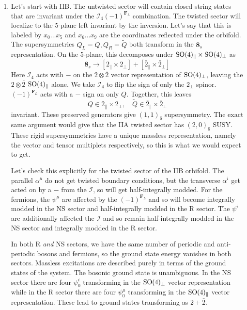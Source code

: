 \documentclass[11pt, class=article, crop=false]{standalone}
\begin{document}
\begin{enumerate}
	\item Let's start with IIB. The untwisted sector will contain closed string states that are invariant under the $\mathcal I_4 (-1)^{\mathbf{F}_L}$ combination. The twisted sector will localize to the 5-plane left invariant by the inversion. Let's say that this is labeled by $x_0 \dots x_5$ and $x_6 \dots x_9$ are the coordinates reflected under the orbifold. The supersymmetries $Q_L = Q, Q_R = \tilde Q$ both transform in the $\mathbf{8}_s$ representation. On the 5-plane, this decomposes under $\mathrm{SO}(4)_\parallel \times \mathrm{SO}(4)_\perp$ as
	\[
		\mathbf{8}_s \to [2_\parallel \times 2_\perp] + [\bar 2_{\parallel} \times \bar 2_{\perp}]
	\]
	Here $\mathcal I_4$ acts with $-$ on the $2 \otimes \bar 2$ vector representation of $\mathrm{SO}(4)_\perp$, leaving the $2 \otimes \bar 2$ $\mathrm{SO}(4)_\parallel$ alone. We take $\mathcal I_4$ to flip the sign of only the $2_\perp$ spinor. $(-1)^{\mathbf{F}_L}$  acts with a $-$ sign on only $Q$. Together, this leaves
	\[
		Q \in 2_\parallel \times 2_\perp, \quad \tilde Q \in \bar 2_\parallel \times \bar 2_\perp
	\]
	invariant. These preserved generators give $(1,1)_6$ supersymmetry. The exact same argument would give that the IIA twisted sector has $(2,0)_6$ SUSY. These rigid supersymmetries have a unique massless representation, namely the vector and tensor multiplets respectively, so this is what we would expect to get.
	
	 Let's check this explicitly for the twisted sector of the IIB orbifold. The parallel $\alpha^\mu$ do not get twisted boundary conditions, but the transverse $\alpha^i$ get acted on by a $-$ from the $\mathcal I$, so will get half-integrally modded. For the fermions, the $\psi^\mu$ are affected by the $(-1)^{\mathbf{F}_L}$ and so will become integrally modded in the NS sector and half-integrally modded in the R sector. The $\psi^i$ are additionally affected the $\mathcal I$ and so remain half-integrally modded in the NS sector and integrally modded in the R sector. 

	In both R \emph{and} NS sectors, we have the same number of periodic and anti-periodic bosons and fermions, so the ground state energy vanishes in both sectors. Massless excitations are described purely in terms of the ground states of the system. The bosonic ground state is unambiguous. In the NS sector there are four $\psi^i_0$ transforming in the $\mathrm{SO}(4)_\perp$ vector representation while in the R sector there are four $\psi^\mu_0$ transforming in the $\mathrm{SO}(4)_\parallel$ vector representation. These lead to ground states transforming as $2 + \bar 2$. 
	

\end{enumerate}
\end{document}
